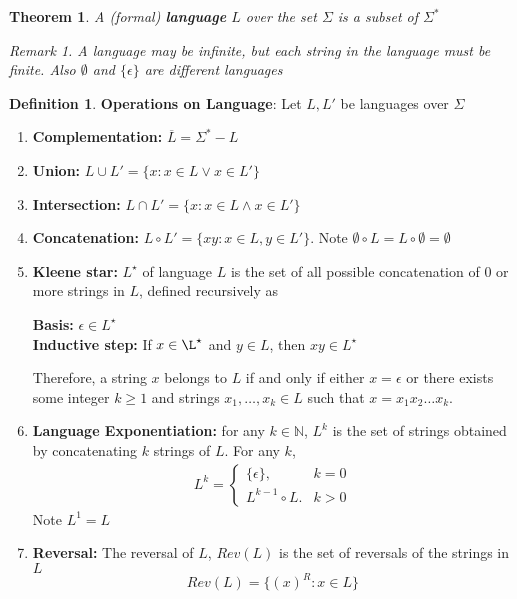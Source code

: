 \documentclass[11pt]{article}
\theoremstyle{plain}%
\newtheorem{theorem}{Theorem}[section]
\theoremstyle{definition}
\newtheorem{defn}{Definition}
\theoremstyle{remark}
\newtheorem*{rem}{Remark}
\newcommand{\N}{\mathbb{N}}
\begin{document}
\begin{theorem}
  \label{language}
  A (formal) \textbf{language} $L$ over the set $\Sigma$ is a subset of $\Sigma^*$
  \begin{rem}
    A language may be infinite, but each \textit{string} in the language must be finite. Also $\emptyset$ and $\{\epsilon\}$ are different languages
  \end{rem}
\end{theorem}

\begin{defn}
  \label{Operations on language}
  \textbf{Operations on Language}: Let $L, L'$ be languages over $\Sigma$
  \begin{enumerate}
    \item \textbf{Complementation: } $\overline{L} = \Sigma^* - L$
    \item \textbf{Union: } $L\cup L' = \{ x: x\in L \lor x\in L'\}$
    \item \textbf{Intersection: } $L\cap L' = \{ x: x\in L \land x\in L'\}$
    \item \textbf{Concatenation: } $L\circ L' = \{ xy: x\in L, y\in L'\} $. Note $\emptyset \circ L = L\circ \emptyset = \emptyset$
    \item \textbf{Kleene star: } $L^{\star}$ of language $L$ is the set of all possible concatenation of 0 or more strings in $L$, defined recursively as
    \begin{center}
      \textbf{Basis: } $\epsilon \in L^{\star}$\\
      \textbf{Inductive step: } If $x\in\L^{\star}$ and $y\in L$, then $xy\in L^{\star}$
    \end{center}
    Therefore, a string $x$ belongs to $L$  if and only if either $x = \epsilon$ or there exists some integer $k \geq 1$ and strings $x_1,\dots,x_k \in L$ such that $x = x_1x_2 \dots x_k$.
    \item \textbf{Language Exponentiation: } for any $k\in \N$, $L^k$ is the set of strings obtained by concatenating $k$ strings of $L$. For any $k$,
    \begin{align*}
      L^k =
      \begin{cases}
        \{ \epsilon \}, & k=0\\
        L^{k-1} \circ L. & k> 0
      \end{cases}
    \end{align*}
    Note $L^1 = L$
    \item \textbf{Reversal: } The reversal of $L$, $Rev(L)$ is the set of reversals of the strings in $L$
    \[
      Rev(L) = \{ (x)^R: x\in L\}
    \]
  \end{enumerate}

\end{defn}
\end{document}
